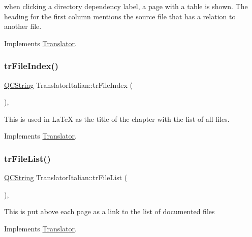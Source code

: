 when clicking a directory dependency label, a page with a table is shown. The heading for the first column mentions the source file that has a relation to another file. 

Implements \mbox{\hyperlink{class_translator}{Translator}}.

\mbox{\label{class_translator_italian_a48041d4a761fce034b2b088caec7e357}} 
\subsubsection{\texorpdfstring{trFileIndex()}{trFileIndex()}}
{\footnotesize\ttfamily \mbox{\hyperlink{class_q_c_string}{Q\+C\+String}} Translator\+Italian\+::tr\+File\+Index (\begin{DoxyParamCaption}{ }\end{DoxyParamCaption})\hspace{0.3cm}{\ttfamily [inline]}, {\ttfamily [virtual]}}

This is used in La\+TeX as the title of the chapter with the list of all files. 

Implements \mbox{\hyperlink{class_translator}{Translator}}.

\mbox{\label{class_translator_italian_aa24c0daac87d64626241a17e82f03262}} 
\subsubsection{\texorpdfstring{trFileList()}{trFileList()}}
{\footnotesize\ttfamily \mbox{\hyperlink{class_q_c_string}{Q\+C\+String}} Translator\+Italian\+::tr\+File\+List (\begin{DoxyParamCaption}{ }\end{DoxyParamCaption})\hspace{0.3cm}{\ttfamily [inline]}, {\ttfamily [virtual]}}

This is put above each page as a link to the list of documented files 

Implements \mbox{\hyperlink{class_translator}{Translator}}.

\mbox{\label{class_translator_italian_a45a60ace4c396d01f11b05cde17b6449}} 
